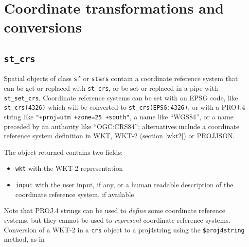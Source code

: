 \documentclass[]{book}
\newenvironment{Shaded}{\begin{snugshade}}{\end{snugshade}}
\newcommand{\CommentTok}[1]{\textcolor[rgb]{0.56,0.35,0.01}{\textit{#1}}}
\newcommand{\KeywordTok}[1]{\textcolor[rgb]{0.13,0.29,0.53}{\textbf{#1}}}
\newcommand{\NormalTok}[1]{#1}
\newcommand{\OperatorTok}[1]{\textcolor[rgb]{0.81,0.36,0.00}{\textbf{#1}}}
\newcommand{\StringTok}[1]{\textcolor[rgb]{0.31,0.60,0.02}{#1}}
\providecommand{\tightlist}{%
  \setlength{\itemsep}{0pt}\setlength{\parskip}{0pt}}
\begin{document}
\hypertarget{projsf}{%
\section{Coordinate transformations and conversions}\label{projsf}}

\hypertarget{st_crs}{%
\subsection{\texorpdfstring{\texttt{st\_crs}}{st\_crs}}\label{st_crs}}

Spatial objects of class \texttt{sf} or \texttt{stars} contain a coordinate
reference system that can be get or replaced with \texttt{st\_crs}, or be
set or replaced in a pipe with \texttt{st\_set\_crs}. Coordinate reference
systems can be set with an EPSG code, like \texttt{st\_crs(4326)} which
will be converted to \texttt{st\_crs(\textquotesingle{}EPSG:4326\textquotesingle{})}, or with a PROJ.4 string
like \texttt{"+proj=utm\ +zone=25\ +south"}, a name like ``WGS84'', or a name
preceded by an authority like ``OGC:CRS84''; alternatives include
a coordinate reference system definition in WKT, WKT-2 (section
\ref{wkt2}) or \href{https://proj.org/specifications/projjson.html}{PROJJSON}.

The object returned contains two fields:

\begin{itemize}
\tightlist
\item
  \texttt{wkt} with the WKT-2 representation
\item
  \texttt{input} with the user input, if any, or a human readable
  description of the coordinate reference system, if available
\end{itemize}

Note that PROJ.4 strings can be used to
\emph{define} some coordinate reference systems, but they cannot be used
to \emph{represent} coordinate reference systems. Conversion of a
WKT-2 in a \texttt{crs} object to a proj4string using the \texttt{\$proj4string}
method, as in

\begin{Shaded}
\end{Shaded}
\end{document}
